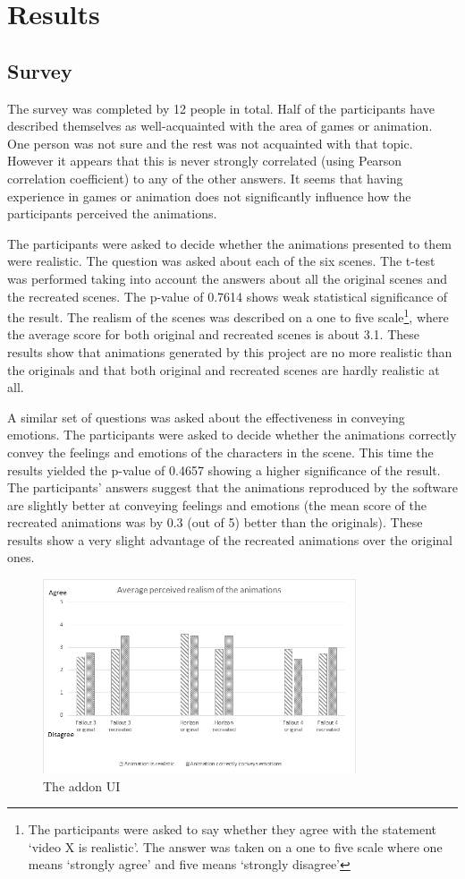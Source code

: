 \chapter{Results \label{chap:results}}

\section{Survey}
The survey was completed by 12 people in total. Half of the participants have described themselves as well-acquainted with the area of games or animation. One person was not sure and the rest was not acquainted with that topic. However it appears that this is never strongly correlated (using Pearson correlation coefficient) to any of the other answers. It seems that having experience in games or animation does not significantly influence how the participants perceived the animations.

The participants were asked to decide whether the animations presented to them were realistic. The question was asked about each of the six scenes. The t-test was performed taking into account the answers about all the original scenes and the recreated scenes. The p-value of 0.7614 shows weak statistical significance of the result. The realism of the scenes was described on a one to five scale\footnote{The participants were asked to say whether they agree with the statement  `video X is realistic'. The answer was taken on a one to five scale where one means `strongly agree' and five means `strongly disagree'}, where the average score for both original and recreated scenes is about 3.1. These results show that animations generated by this project are no more realistic than the originals and that both original and recreated scenes are hardly realistic at all.
	
A similar set of questions was asked about the effectiveness in conveying emotions. The participants were asked to decide whether the animations correctly convey the feelings and emotions of the characters in the scene. This time the results yielded the p-value of 0.4657 showing a higher significance of the result. The participants' answers suggest that the animations reproduced by the software are slightly better at conveying feelings and emotions (the mean score of the recreated animations was by 0.3 (out of 5) better than the originals). These results show a very slight advantage of the recreated animations over the original ones.


\begin{figure}[H]
	\centerline{\includegraphics[width = 25em]{img/results/realism.png}}
	\caption{The addon UI}\label{fig:realism_graph}
\end{figure}












